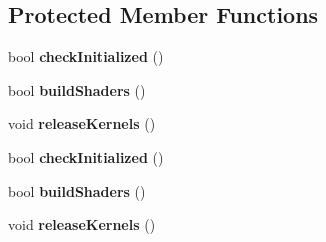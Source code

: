 \subsection*{Protected Member Functions}
\begin{DoxyCompactItemize}
\item 
\mbox{\label{classbtSoftBodySolverOutputDXtoDX_afc40e9e297ae6decfcad0a043c2c3fd3}} 
bool {\bfseries check\+Initialized} ()
\item 
\mbox{\label{classbtSoftBodySolverOutputDXtoDX_af0390dad6650ea973dfb8e483ead99c5}} 
bool {\bfseries build\+Shaders} ()
\item 
\mbox{\label{classbtSoftBodySolverOutputDXtoDX_a8a9239e3b28ca3521b54808be7101939}} 
void {\bfseries release\+Kernels} ()
\item 
\mbox{\label{classbtSoftBodySolverOutputDXtoDX_afc40e9e297ae6decfcad0a043c2c3fd3}} 
bool {\bfseries check\+Initialized} ()
\item 
\mbox{\label{classbtSoftBodySolverOutputDXtoDX_af0390dad6650ea973dfb8e483ead99c5}} 
bool {\bfseries build\+Shaders} ()
\item 
\mbox{\label{classbtSoftBodySolverOutputDXtoDX_a8a9239e3b28ca3521b54808be7101939}} 
void {\bfseries release\+Kernels} ()
\end{DoxyCompactItemize}
